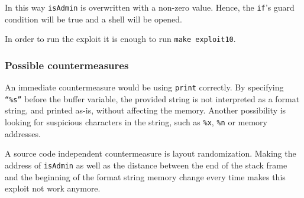In this way \texttt{isAdmin} is overwritten with a non-zero value. Hence, the \texttt{if}'s guard condition will be true and a shell will be opened.

In order to run the exploit it is enough to run \texttt{make exploit10}.

\subsubsection{Possible countermeasures}
An immediate countermeasure would be using \texttt{print} correctly. By specifying \texttt{``\%s''} before the buffer variable, the provided string is not interpreted as a format string, and printed as-is, without affecting the memory. Another possibility is looking for suspicious characters in the string, such as \texttt{\%x}, \texttt{\%n} or memory addresses. 

A source code independent countermeasure is layout randomization. Making the address of \texttt{isAdmin} as well as the distance between the end of the stack frame and the beginning of the format string memory change every time makes this exploit not work anymore. 